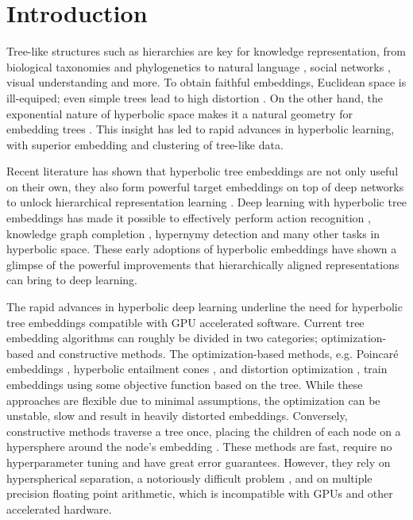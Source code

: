 \section{Introduction}
\label{sec:introduction}
\vspace{-0.1cm}
Tree-like structures such as hierarchies are key for knowledge representation, from biological taxonomies \citep{padial2010integrative} and phylogenetics \citep{kapli2020phylogenetic} to natural language \citep{miller1995wordnet, tifrea2018poincar, yang2016hierarchical}, social networks \citep{freeman2004development}, visual understanding \citep{desai2023hyperbolic} and more. To obtain faithful embeddings, Euclidean space is ill-equiped; even simple trees lead to high distortion \citep{sonthalia2020tree}. On the other hand, the exponential nature of hyperbolic space  makes it a natural geometry for embedding trees \citep{nickel2018learning}. This insight has led to rapid advances in hyperbolic learning, with superior embedding \citep{sala2018representation} and clustering \citep{chami2020trees} of tree-like data.

Recent literature has shown that hyperbolic tree embeddings are not only useful on their own, they also form powerful target embeddings on top of deep networks to unlock hierarchical representation learning \citep{peng2021hyperbolic,mettes2024hyperbolic}. Deep learning with hyperbolic tree embeddings has made it possible to effectively perform action recognition \citep{long2020searching}, knowledge graph completion \citep{kolyvakis2020hyperbolic}, hypernymy detection \citep{tifrea2018poincar} and many other tasks in hyperbolic space. These early adoptions of hyperbolic embeddings have shown a glimpse of the powerful improvements that hierarchically aligned representations can bring to deep learning.

The rapid advances in hyperbolic deep learning underline the need for hyperbolic tree embeddings compatible with GPU accelerated software. Current tree embedding algorithms can roughly be divided in two categories; optimization-based and constructive methods. The optimization-based methods, e.g. Poincaré embeddings \citep{nickel2017poincare}, hyperbolic entailment cones \citep{ganea2018hyperbolic}, and distortion optimization \citep{yu2022skin}, train embeddings using some objective function based on the tree. While these approaches are flexible due to minimal assumptions, the optimization can be unstable, slow and result in heavily distorted embeddings. Conversely, constructive methods traverse a tree once, placing the children of each node on a hypersphere around the node's embedding \citep{sarkar2011low,sala2018representation}. These methods are fast, require no hyperparameter tuning and have great error guarantees. However, they rely on hyperspherical separation, a notoriously difficult problem \citep{saff1997distributing}, and on multiple precision floating point arithmetic, which is incompatible with GPUs and other accelerated hardware. 

